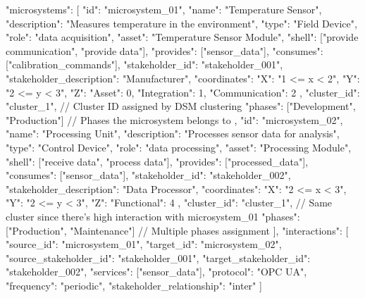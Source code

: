 {
  "microsystems": [
    {
      "id": "microsystem_01",
      "name": "Temperature Sensor",
      "description": "Measures temperature in the environment",
      "type": "Field Device",
      "role": "data acquisition",
      "asset": "Temperature Sensor Module",
      "shell": ["provide communication", "provide data"],
      "provides": ["sensor_data"],
      "consumes": ["calibration_commands"],
      "stakeholder_id": "stakeholder_001",
      "stakeholder_description": "Manufacturer",
      "coordinates": {
        "X": "1 <= x < 2",
        "Y": "2 <= y < 3",
        "Z": {
          "Asset": 0,
          "Integration": 1,
          "Communication": 2
        }
      },
      "cluster_id": "cluster_1",  // Cluster ID assigned by DSM clustering
      "phases": ["Development", "Production"]  // Phases the microsystem belongs to
    },
    {
      "id": "microsystem_02",
      "name": "Processing Unit",
      "description": "Processes sensor data for analysis",
      "type": "Control Device",
      "role": "data processing",
      "asset": "Processing Module",
      "shell": ["receive data", "process data"],
      "provides": ["processed_data"],
      "consumes": ["sensor_data"],
      "stakeholder_id": "stakeholder_002",
      "stakeholder_description": "Data Processor",
      "coordinates": {
        "X": "2 <= x < 3",
        "Y": "2 <= y < 3",
        "Z": {
          "Functional": 4
        }
      },
      "cluster_id": "cluster_1",  // Same cluster since there's high interaction with microsystem_01
      "phases": ["Production", "Maintenance"]  // Multiple phases assignment
    }
  ],
  "interactions": [
    {
      "source_id": "microsystem_01",
      "target_id": "microsystem_02",
      "source_stakeholder_id": "stakeholder_001",
      "target_stakeholder_id": "stakeholder_002",
      "services": ["sensor_data"],
      "protocol": "OPC UA",
      "frequency": "periodic",
      "stakeholder_relationship": "inter"
    }
  ]
}